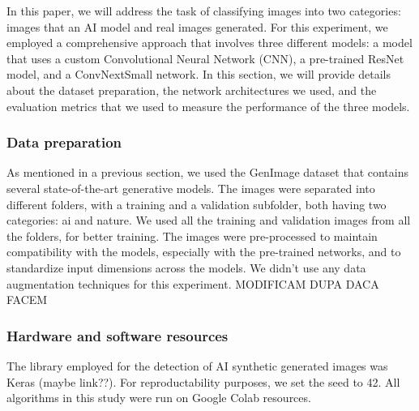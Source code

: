 \documentclass[runningheads]{llncs}
\begin{document}
In this paper, we will address the task of classifying images into two categories: images that an AI model and real images generated. For this experiment, we employed a comprehensive approach that involves three different models: a model that uses a custom Convolutional Neural Network (CNN), a pre-trained ResNet model, and a ConvNextSmall network. In this section, we will provide details about the dataset preparation, the network architectures we used, and the evaluation metrics that we used to measure the performance of the three models. 

\subsubsection{Data preparation} As mentioned in a previous section, we used the GenImage dataset that contains several state-of-the-art generative models. The images were separated into different folders, with a training and a validation subfolder, both having two categories: ai and nature. We used all the training and validation images from all the folders, for better training. The images were pre-processed to maintain compatibility with the models, especially with the pre-trained networks, and to standardize input dimensions across the models. We didn't use any data augmentation techniques for this experiment. MODIFICAM DUPA DACA FACEM


\subsubsection{Hardware and software resources} The library employed for the detection of AI synthetic generated images was Keras (maybe link??). For reproductability purposes, we set the seed to 42. All algorithms in this study were run on Google Colab resources.
\end{document}

